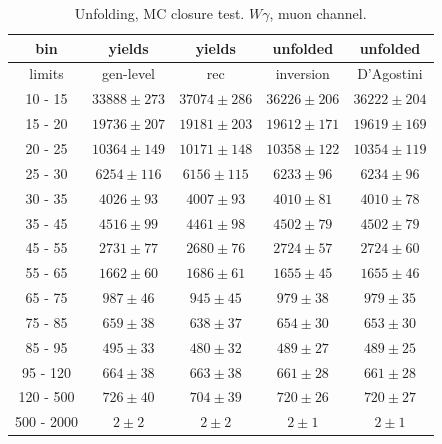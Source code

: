 \begin{table}[h]
  \scriptsize
  \begin{center}
  \caption{Unfolding, MC closure test. $W\gamma$, muon channel.}
  \begin{tabular}{|c|c|c|c|c|}
  bin &  yields &   yields &  unfolded &  unfolded \\ \hline
   limits &  gen-level & rec &  inversion &  D'Agostini \\ \hline
10 -  15 &     $33888\pm 273$ &     $37074\pm 286$ &     $36226\pm206$ &     $36222\pm204$ \\ \hline
 15 -  20 &     $19736\pm 207$ &     $19181\pm 203$ &     $19612\pm171$ &     $19619\pm169$ \\ \hline
 20 -  25 &     $10364\pm 149$ &     $10171\pm 148$ &     $10358\pm122$ &     $10354\pm119$ \\ \hline
 25 -  30 &     $6254\pm 116$ &     $6156\pm 115$ &     $6233\pm96$ &     $6234\pm96$ \\ \hline
 30 -  35 &     $4026\pm  93$ &     $4007\pm  93$ &     $4010\pm81$ &     $4010\pm78$ \\ \hline
 35 -  45 &     $4516\pm  99$ &     $4461\pm  98$ &     $4502\pm79$ &     $4502\pm79$ \\ \hline
 45 -  55 &     $2731\pm  77$ &     $2680\pm  76$ &     $2724\pm57$ &     $2724\pm60$ \\ \hline
 55 -  65 &     $1662\pm  60$ &     $1686\pm  61$ &     $1655\pm45$ &     $1655\pm46$ \\ \hline
 65 -  75 &     $987\pm  46$ &     $945\pm  45$ &     $979\pm38$ &     $979\pm35$ \\ \hline
 75 -  85 &     $659\pm  38$ &     $638\pm  37$ &     $654\pm30$ &     $653\pm30$ \\ \hline
 85 -  95 &     $495\pm  33$ &     $480\pm  32$ &     $489\pm27$ &     $489\pm25$ \\ \hline
 95 - 120 &     $664\pm  38$ &     $663\pm  38$ &     $661\pm28$ &     $661\pm28$ \\ \hline
120 - 500 &     $726\pm  40$ &     $704\pm  39$ &     $720\pm26$ &     $720\pm27$ \\ \hline
500 - 2000 &     $2\pm   2$ &     $2\pm   2$ &     $2\pm1$ &     $2\pm1$ \\ \hline
  \end{tabular}
  \label{tab:unf_mc_closure_MUON_WGamma}
  \end{center}
\end{table}

